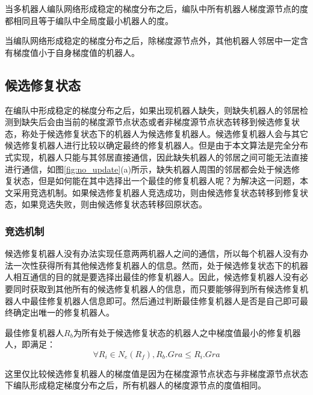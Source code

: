 \begin{cor}
	\label{cor:sourcegradient_leastdegree}
	当多机器人编队网络形成稳定的梯度分布之后，编队中所有机器人梯度源节点的度都相同且等于编队中全局度最小机器人的度。
\end{cor}

\begin{cor}
	\label{cor:neighbor_gradient}
	当编队网络形成稳定的梯度分布之后，除梯度源节点外，其他机器人邻居中一定含有梯度值小于自身梯度值的机器人。
\end{cor}

\subsection{候选修复状态}
在编队中形成稳定的梯度分布之后，如果出现机器人缺失，则缺失机器人的邻居检测到缺失后会由当前的梯度源节点状态或者非梯度源节点状态转移到候选修复状态，称处于候选修复状态下的机器人为候选修复机器人。候选修复机器人会与其它候选修复机器人进行比较以确定最终的修复机器人。但是由于本文算法是完全分布式实现，机器人只能与其邻居直接通信，因此缺失机器人的邻居之间可能无法直接进行通信，如图\ref{fig:no_update}(a)所示，缺失机器人周围的邻居都会处于候选修复状态，但是如何能在其中选择出一个最佳的修复机器人呢？为解决这一问题，本文采用竞选机制。如果候选修复机器人竞选成功，则由候选修复状态转移到修复状态，如果竞选失败，则由候选修复状态转移回原状态。

\subsubsection{竞选机制}
候选修复机器人没有办法实现任意两两机器人之间的通信，所以每个机器人没有办法一次性获得所有其他候选修复机器人的信息。然而，处于候选修复状态下的机器人相互通信的目的就是要选择出最佳的修复机器人。因此，候选修复机器人没有必要同时获取到其他所有的候选修复机器人的信息，而只要能够得到所有候选修复机器人中最佳修复机器人信息即可。然后通过判断最佳修复机器人是否是自己即可最终确定出唯一的修复机器人。
\begin{defn}
	最佳修复机器人$R_b$为所有处于候选修复状态的机器人之中梯度值最小的修复机器人，即满足：\\
	\[
		\forall R_i \in N_e(R_f), R_b.Gra \leq R_i.Gra
	\]
\end{defn}
这里仅比较候选修复机器人的梯度值是因为在梯度源节点状态与非梯度源节点状态下编队形成稳定梯度分布之后，所有机器人的梯度源节点的度值相同。


